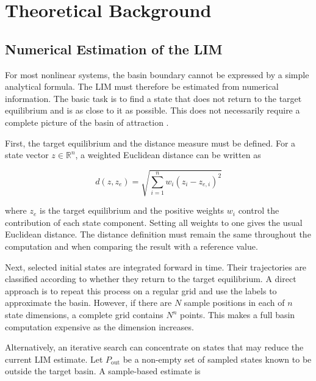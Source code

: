 \chapter{Theoretical Background}

\label{ch:background}



\section{Numerical Estimation of the LIM}

For most nonlinear systems, the basin boundary cannot be expressed by a simple analytical formula. The LIM must therefore be estimated from numerical information. The basic task is to find a state that does not return to the target equilibrium and is as close to it as possible. This does not necessarily require a complete picture of the basin of attraction \cite{ref12}.

\begin{revision}
First, the target equilibrium and the distance measure must be defined. For a state vector $z\in\mathbb{R}^n$, a weighted Euclidean distance can be written as

\begin{equation}
  d(z, {z}_{e}) = \sqrt{\sum_{i = 1}^{n}{w}_{i}{({z}_{i} - {z}_{e,i})}^{2}}
\end{equation}
\end{revision}

where ${z}_{e}$ is the target equilibrium and the positive weights ${w}_{i}$ control the contribution of each state component. Setting all weights to one gives the usual Euclidean distance. The distance definition must remain the same throughout the computation and when comparing the result with a reference value.

\begin{revision}
Next, selected initial states are integrated forward in time. Their trajectories are classified according to whether they return to the target equilibrium. A direct approach is to repeat this process on a regular grid and use the labels to approximate the basin. However, if there are $N$ sample positions in each of $n$ state dimensions, a complete grid contains $N^n$ points. This makes a full basin computation expensive as the dimension increases.
\end{revision}

Alternatively, an iterative search can concentrate on states that may reduce the current LIM estimate. Let ${P}_{\mathrm{out}}$ be a non-empty set of sampled states known to be outside the target basin. A sample-based estimate is

